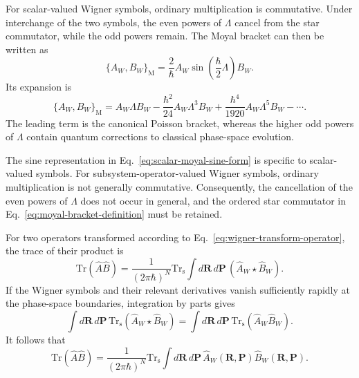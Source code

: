 \documentclass[
  11pt,
  letterpaper,
  onehalfspacing,
  normalmargins,
  equalmargins,
  oneside
]{ut-thesis}
\begin{document}
For scalar-valued Wigner symbols, ordinary multiplication is commutative.
Under interchange of the two symbols, the even powers of \(\Lambda\) cancel
from the star commutator, while the odd powers remain. The Moyal bracket can
then be written as
\begin{equation}
\{A_W,B_W\}_{\mathrm M}
=
\frac{2}{\hbar}
A_W
\sin\left(
\frac{\hbar}{2}\Lambda
\right)
B_W.
\label{eq:scalar-moyal-sine-form}
\end{equation}
Its expansion is
\begin{equation}
\{A_W,B_W\}_{\mathrm M}
=
A_W\Lambda B_W
-
\frac{\hbar^2}{24}
A_W\Lambda^3B_W
+
\frac{\hbar^4}{1920}
A_W\Lambda^5B_W
-
\cdots .
\label{eq:scalar-moyal-expansion}
\end{equation}
The leading term is the canonical Poisson bracket, whereas the higher odd
powers of \(\Lambda\) contain quantum corrections to classical phase-space
evolution.

The sine representation in Eq.~\eqref{eq:scalar-moyal-sine-form} is specific
to scalar-valued symbols. For subsystem-operator-valued Wigner symbols,
ordinary multiplication is not generally commutative. Consequently, the
cancellation of the even powers of \(\Lambda\) does not occur in general, and
the ordered star commutator in Eq.~\eqref{eq:moyal-bracket-definition} must be
retained.

For two operators transformed according to
Eq.~\eqref{eq:wigner-transform-operator}, the trace of their product is
\begin{equation}
\mathrm{Tr}(\hat A\hat B)
=
\frac{1}{(2\pi\hbar)^N}
\mathrm{Tr}_{\mathrm s}
\int d\mathbf R\,d\mathbf P\,
\left(
\hat A_W\star\hat B_W
\right).
\label{eq:wigner-trace-star-product}
\end{equation}
If the Wigner symbols and their relevant derivatives vanish sufficiently
rapidly at the phase-space boundaries, integration by parts gives
\begin{equation}
\int d\mathbf R\,d\mathbf P\,
\mathrm{Tr}_{\mathrm s}
\left(
\hat A_W\star\hat B_W
\right)
=
\int d\mathbf R\,d\mathbf P\,
\mathrm{Tr}_{\mathrm s}
\left(
\hat A_W\hat B_W
\right).
\label{eq:integrated-star-product}
\end{equation}
It follows that
\begin{equation}
\mathrm{Tr}(\hat A\hat B)
=
\frac{1}{(2\pi\hbar)^N}
\mathrm{Tr}_{\mathrm s}
\int d\mathbf R\,d\mathbf P\,
\hat A_W(\mathbf R,\mathbf P)
\hat B_W(\mathbf R,\mathbf P).
\label{eq:wigner-trace-two-operators}
\end{equation}
\end{document}
